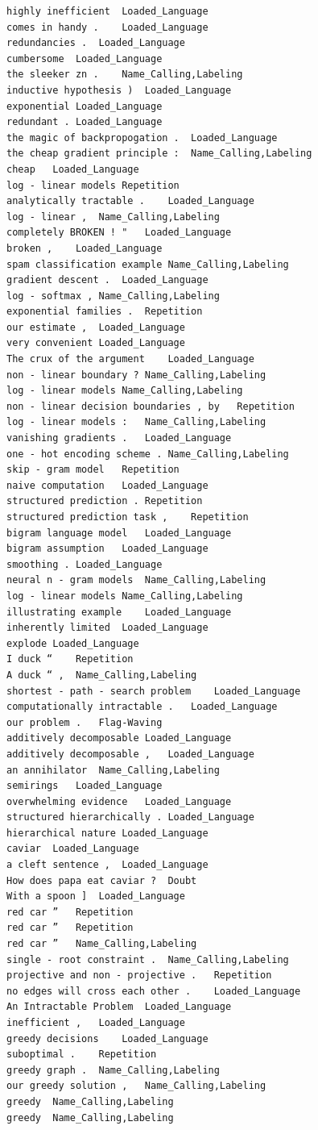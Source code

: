 \documentclass[11pt]{article}
\begin{document}
\begin{appendices}
\footnotesize
\begin{verbatim}
highly inefficient	Loaded_Language
comes in handy .	Loaded_Language
redundancies .	Loaded_Language
cumbersome	Loaded_Language
the sleeker zn .	Name_Calling,Labeling
inductive hypothesis )	Loaded_Language
exponential	Loaded_Language
redundant .	Loaded_Language
the magic of backpropogation .	Loaded_Language
the cheap gradient principle :	Name_Calling,Labeling
cheap	Loaded_Language
log - linear models	Repetition
analytically tractable .	Loaded_Language
log - linear ,	Name_Calling,Labeling
completely BROKEN ! "	Loaded_Language
broken ,	Loaded_Language
spam classification example	Name_Calling,Labeling
gradient descent .	Loaded_Language
log - softmax ,	Name_Calling,Labeling
exponential families .	Repetition
our estimate ,	Loaded_Language
very convenient	Loaded_Language
The crux of the argument	Loaded_Language
non - linear boundary ?	Name_Calling,Labeling
log - linear models	Name_Calling,Labeling
non - linear decision boundaries , by	Repetition
log - linear models :	Name_Calling,Labeling
vanishing gradients .	Loaded_Language
one - hot encoding scheme .	Name_Calling,Labeling
skip - gram model	Repetition
naive computation	Loaded_Language
structured prediction .	Repetition
structured prediction task ,	Repetition
bigram language model	Loaded_Language
bigram assumption	Loaded_Language
smoothing .	Loaded_Language
neural n - gram models	Name_Calling,Labeling
log - linear models	Name_Calling,Labeling
illustrating example	Loaded_Language
inherently limited	Loaded_Language
explode	Loaded_Language
I duck “	Repetition
A duck “ ,	Name_Calling,Labeling
shortest - path - search problem	Loaded_Language
computationally intractable .	Loaded_Language
our problem .	Flag-Waving
additively decomposable	Loaded_Language
additively decomposable ,	Loaded_Language
an annihilator	Name_Calling,Labeling
semirings	Loaded_Language
overwhelming evidence	Loaded_Language
structured hierarchically .	Loaded_Language
hierarchical nature	Loaded_Language
caviar	Loaded_Language
a cleft sentence ,	Loaded_Language
How does papa eat caviar ?	Doubt
With a spoon ]	Loaded_Language
red car ”	Repetition
red car ”	Repetition
red car ”	Name_Calling,Labeling
single - root constraint .	Name_Calling,Labeling
projective and non - projective .	Repetition
no edges will cross each other .	Loaded_Language
An Intractable Problem	Loaded_Language
inefficient ,	Loaded_Language
greedy decisions	Loaded_Language
suboptimal .	Repetition
greedy graph .	Name_Calling,Labeling
our greedy solution ,	Name_Calling,Labeling
greedy	Name_Calling,Labeling
greedy	Name_Calling,Labeling

\end{verbatim}
\end{appendices}
\end{document}

